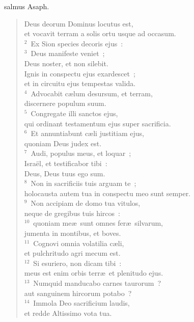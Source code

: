 \bchapter
{}salmus Asaph. \begin{flushleft}\begin{verse}\vspace{6pt}Deus deorum Dominus locutus est,\\ et vocavit terram a solis ortu usque ad occasum.\\
${}^{2}$~Ex Sion species decoris ejus~:\\
${}^{3}$~Deus manifeste veniet~;\\ Deus noster, et non silebit.\\ Ignis in conspectu ejus exardescet~;\\ et in circuitu ejus tempestas valida.\\
${}^{4}$~Advocabit c\ae lum desursum, et terram,\\ discernere populum suum.\\
${}^{5}$~Congregate illi sanctos ejus,\\ qui ordinant testamentum ejus super sacrificia.\\
${}^{6}$~Et annuntiabunt c\ae li justitiam ejus,\\ quoniam Deus judex est.\\
${}^{7}$~Audi, populus meus, et loquar~;\\ Isra\"el, et testificabor tibi~:\\ Deus, Deus tuus ego sum.\\
${}^{8}$~Non in sacrificiis tuis arguam te~;\\ holocausta autem tua in conspectu meo sunt semper.\\
${}^{9}$~Non accipiam de domo tua vitulos,\\ neque de gregibus tuis hircos~:\\
${}^{10}$~quoniam me\ae\ sunt omnes fer\ae\ silvarum,\\ jumenta in montibus, et boves.\\
${}^{11}$~Cognovi omnia volatilia c\ae li,\\ et pulchritudo agri mecum est.\\
${}^{12}$~Si esuriero, non dicam tibi~:\\ meus est enim orbis terr\ae\ et plenitudo ejus.\\
${}^{13}$~Numquid manducabo carnes taurorum~?\\ aut sanguinem hircorum potabo~?\\
${}^{14}$~Immola Deo sacrificium laudis,\\ et redde Altissimo vota tua.\\

\end{verse}
\end{flushleft}
